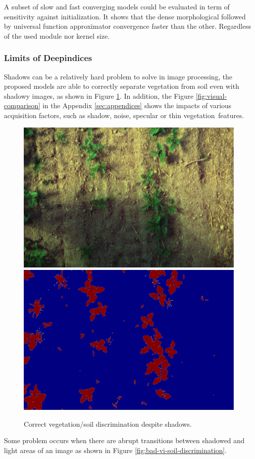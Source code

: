 \documentclass[../thesis.tex]{subfiles}
\begin{document}
	A subset of slow and fast converging models could be evaluated in term of sensitivity against initialization. It shows that the dense morphological followed by universal function {approximator convergence faster than the other. Regardless of the used module nor kernel size.}
	
	\newpage
	\subsubsection{Limits of Deepindices}
	Shadows can be a relatively hard problem to solve in image processing, the proposed models are able to correctly separate vegetation from soil even with shadowy images, as shown in Figure \ref{fig:correct-vi-soil-discrimination}. In addition, the  {Figure} \ref{fig:visual-comparison} in the  Appendix \ref{sec:appendices} shows the impacts of various acquisition factors, such as shadow, noise, specular or thin \mbox{vegetation features.}
	
	
	\begin{figure}[H]
		\centering
		\includegraphics[width=0.45\linewidth]{img/idx/0090-false}
		\includegraphics[width=0.45\linewidth]{img/idx/0090}
		\caption{Correct vegetation/soil discrimination despite shadows.}
		\label{fig:correct-vi-soil-discrimination}
	\end{figure}
	
	Some problem occurs when there are abrupt transitions between shadowed and light areas of an image as shown in Figure \ref{fig:bad-vi-soil-discrimination}.
	
\end{document}
